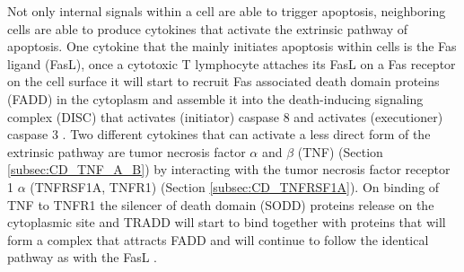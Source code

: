 Not only internal signals within a cell are able to trigger apoptosis, neighboring cells are able to produce cytokines that activate the extrinsic pathway of apoptosis. One cytokine that the mainly initiates apoptosis within cells is the Fas ligand (FasL), once a cytotoxic T lymphocyte attaches its FasL on a Fas receptor on the cell surface it will start to recruit Fas associated death domain proteins (FADD) in the cytoplasm and assemble it into the death-inducing signaling complex (DISC) that activates (initiator) caspase 8 and activates (executioner) caspase 3 \cite{}.
Two different cytokines that can activate a less direct form of the extrinsic pathway are tumor necrosis factor $\alpha$ and $\beta$ (TNF) (Section \ref{subsec:CD_TNF_A_B}) by interacting with the tumor necrosis factor receptor 1 $\alpha$ (TNFRSF1A, TNFR1) (Section \ref{subsec:CD_TNFRSF1A}). On binding of TNF to TNFR1 the silencer of death domain (SODD) proteins release on the cytoplasmic site and TRADD will start to bind together with proteins that will form a complex that attracts FADD and will continue to follow the identical pathway as with the FasL \cite{}.

%
%
%
%
%
%
%
%


